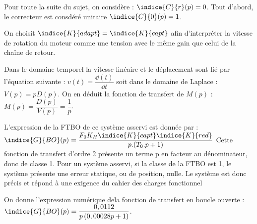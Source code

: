 Pour toute la suite du sujet, on considère : $\indice{C}{r}(p)=0$. Tout d'abord, le correcteur est consdéré unitaire $\indice{C}{0}(p)=1$.
\fi

%
\question{}

\ifprof
\begin{corrige}%
On choisit $\indice{K}{adapt}=\indice{K}{capt}$ afin d’interpréter la vitesse de rotation du moteur comme une tension avec le même gain que celui de la chaîne de retour.

Dans le domaine temporel la vitesse linéaire et le déplacement sont lié par l’équation suivante :
$v(t)=\dfrac{\dd(t)}{\dd t}$ soit dans le domaine de Laplace : $V(p)=pD(p)$.
On en déduit la fonction de transfert de $M(p)$ : $M(p)=\dfrac{D(p)}{V(p)} =\dfrac{1}{p}$.

\end{corrige}
\else
\fi

\ifprof
\begin{corrige}%
L’expression de la FTBO de ce système asservi est donnée par :
%
%
$\indice{G}{BO}(p)= \dfrac{F_0 K_H\indice{K}{capt}\indice{K}{red}}{p.(T_0.p+1)}$
Cette fonction de transfert d’ordre 2 présente un terme p en facteur au dénominateur, donc de classe 1.
Pour un système asservi, si la classe de la FTBO est 1, le système présente une erreur statique, ou de position, nulle. Le système est donc précis et répond à une exigence du cahier des charges fonctionnel

\end{corrige}
\else
\fi
 
  On donne l’expression numérique dela fonction de transfert en boucle ouverte :
  $\indice{G}{BO}(p)=\dfrac{0,0112}{p\left( 0,00028 p +1\right)}$.

